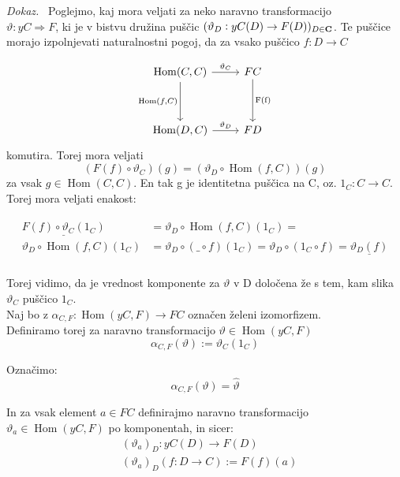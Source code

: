 \documentclass[12pt,a4paper]{book}
\theoremstyle{definition}
\theoremstyle{plain}
\newenvironment{dokaz}{\emph{Dokaz.}\ }{\hspace{\fill}{$\Box$}}
\theoremstyle{definition}
\theoremstyle{remark}
\DeclareMathOperator{\Hom}{Hom}
\begin{document}
\begin{dokaz}
Poglejmo, kaj mora veljati za neko naravno transformacijo \\ $\vartheta : yC \Rightarrow F$, ki je v bistvu družina puščic $(\vartheta_D : yC(D) \to F(D))_{D \in \bf{C}}$. Te puščice morajo izpolnjevati naturalnostni pogoj, da za vsako puščico $f : D \to C$

\[ \begin{tikzcd}[row sep=huge]
\Hom(C,C) \arrow[r, "\vartheta_C"] \arrow[d, "{\Hom(f,C)}"'] & FC \arrow[d, "\text{F(f)}"] \\
\Hom(D,C) \arrow[r, "\vartheta_D"] & FD
\end{tikzcd} \]
komutira. Torej mora veljati 
$$(F(f) \circ \vartheta_C) (g) = (\vartheta_D \circ \Hom(f,C)) (g)$$
za vsak $g \in \Hom(C,C)$. En tak g je identitetna puščica na C, oz. $1_C : C \to C$. Torej mora veljati enakost:

\begin{align} \label{eq1}
\begin{split}
\underline{F(f) \circ \vartheta_C(1_C)}& = \vartheta_D \circ \Hom(f,C)(1_C) = \\
\vartheta_D \circ \Hom(f,C)(1_C)& = \vartheta_D \circ ( \_ \circ f )(1_C) =
\vartheta_D \circ ( 1_C \circ f) = \underline{\vartheta_D(f)}
\end{split}
\end{align}
\\
Torej vidimo, da je vrednost komponente za $\vartheta$ v D določena že s tem, kam slika $\vartheta_C$ puščico $1_C$. \\
Naj bo z $\alpha_{C,F} : \Hom(yC,F) \to FC$ označen želeni izomorfizem. \\
Definiramo torej za naravno transformacijo $\vartheta \in \Hom(yC,F)$
\begin{equation}
\alpha_{C,F}(\vartheta) := \vartheta_C(1_C)
\end{equation}

Označimo:
\begin{equation}
\boxed{\alpha_{C,F}(\vartheta) = \widehat{\vartheta}}
\end{equation} 

In za vsak element $a \in FC$ definirajmo naravno transformacijo $\vartheta_a \in \Hom(yC,F)$ po komponentah, in sicer:
\begin{align}
&(\vartheta_a)_D : yC(D) \to F(D) \\
&(\vartheta_a)_D(f : D \to C) := F(f)(a)
\end{align}


\end{dokaz}
\end{document}
